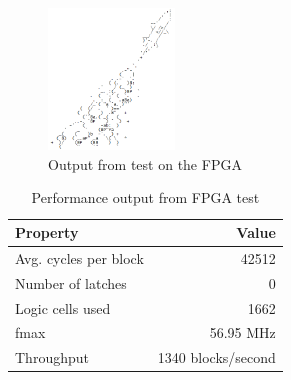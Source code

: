 \begin{figure}
    \centering
    \includegraphics[width=0.3\textwidth]{images/rocket}
    \caption{Output from test on the FPGA}
    \label{fig:rocket}
\end{figure}
%
\begin{table}[htp]
    \begin{center}
        \begin{tabular}{l | r}
            Property              & Value              \\
            \hline
            Avg. cycles per block & 42512              \\
            Number of latches     & 0                  \\
            Logic cells used      & 1662               \\
            fmax                  & 56.95 MHz          \\
            Throughput            & 1340 blocks/second \\
        \end{tabular}
        \caption{Performance output from FPGA test}
        \label{tab:fpga_performance}
    \end{center}
\end{table}
